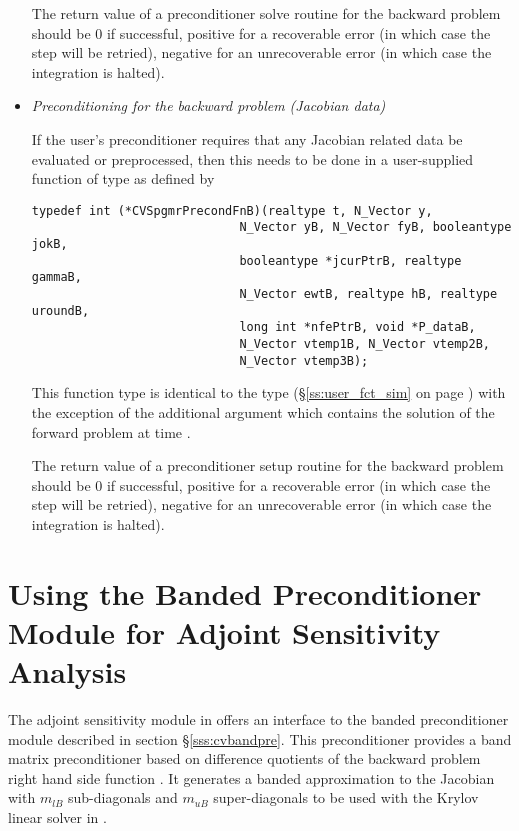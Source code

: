 \begin{itemize}
  The return value of a preconditioner solve routine for the backward
  problem should be $0$ if successful, 
  positive for a recoverable error (in which case the step will be retried),     
  negative for an unrecoverable error (in which case the integration is halted).

\item {\em Preconditioning for the backward problem
    (Jacobian data)}

  If the user's preconditioner requires that any Jacobian related data
  be evaluated or preprocessed, then this needs to be done in a
  user-supplied {\C} function of type  
  as defined by
\begin{verbatim}
typedef int (*CVSpgmrPrecondFnB)(realtype t, N_Vector y, 
                             N_Vector yB, N_Vector fyB, booleantype jokB, 
                             booleantype *jcurPtrB, realtype gammaB,
                             N_Vector ewtB, realtype hB, realtype uroundB,
                             long int *nfePtrB, void *P_dataB,
                             N_Vector vtemp1B, N_Vector vtemp2B,
                             N_Vector vtemp3B);
\end{verbatim}
  This function type is identical to the type 
  (\S\ref{ss:user_fct_sim} on page \pageref{p:precond}) with the exception
  of the additional argument  which contains the solution of the 
  forward problem at time .

  The return value of a preconditioner setup routine for the backward
  problem should be $0$ if successful, 
  positive for a recoverable error (in which case the step will be retried),     
  negative for an unrecoverable error (in which case the integration is halted).

\end{itemize}

\section{Using the Banded Preconditioner Module for Adjoint Sensitivity Analysis}

The adjoint sensitivity module in {\cvodes} offers an interface to the banded 
preconditioner module {\cvbandpre} described in section \S\ref{sss:cvbandpre}.
This preconditioner provides a band matrix preconditioner based on difference
quotients of the backward problem right hand side function . It generates
a banded approximation to the Jacobian with $m_{lB}$ sub-diagonals and $m_{uB}$
super-diagonals to be used with the Krylov linear solver in {\cvspgmr}.


